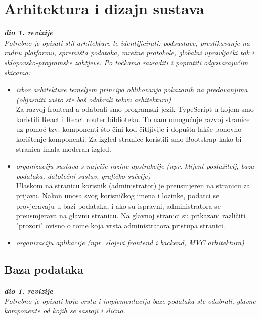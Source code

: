 \chapter{Arhitektura i dizajn sustava}
		
		\textbf{\textit{dio 1. revizije}}\\

		\textit{ Potrebno je opisati stil arhitekture te identificirati: podsustave, preslikavanje na radnu platformu, spremišta podataka, mrežne protokole, globalni upravljački tok i sklopovsko-programske zahtjeve. Po točkama razraditi i popratiti odgovarajućim skicama:}
	\begin{itemize}
		\item 	\textit{izbor arhitekture temeljem principa oblikovanja pokazanih na predavanjima (objasniti zašto ste baš odabrali takvu arhitekturu)}
		\\Za razvoj frontend-a odabrali smo programski jezik TypeScript u kojem smo koristili React i React router biblioteku. To nam omogućuje razvoj stranice uz pomoć tzv. komponenti što čini kod čitljivije i dopušta lakše ponovno korištenje komponenti. Za izgled stranice koristili smo Bootstrap kako bi stranica imala moderan izgled. 
		
		\item 	\textit{organizaciju sustava s najviše razine apstrakcije (npr. klijent-poslužitelj, baza podataka, datotečni sustav, grafičko sučelje)}
		\\Ulaskom na stranicu korisnik (administrator) je preusmjeren na stranicu za prijavu. Nakon unosa svog korisničkog imena i lozinke, podatci se provjeravaju u bazi podataka, i ako su ispravni, administratora se  preusmjerava na glavnu stranicu. Na glavnoj stranici su prikazani
		različiti "prozori" ovisno o tome koja vrsta administratora pristupa stranici.
		\item 	\textit{organizaciju aplikacije (npr. slojevi frontend i backend, MVC arhitektura) }		
	\end{itemize}

	

		

				
		\section{Baza podataka}
			
			\textbf{\textit{dio 1. revizije}}\\
			
		\textit{Potrebno je opisati koju vrstu i implementaciju baze podataka ste odabrali, glavne komponente od kojih se sastoji i slično.}\\
		
